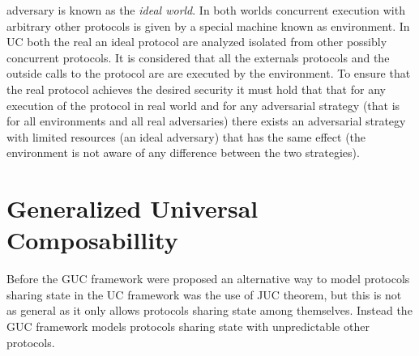 adversary is known as the \textit{ideal world}. In both worlds concurrent execution with arbitrary other protocols is
given by a special machine known as environment. In UC both the real an ideal protocol are analyzed isolated from other
possibly concurrent protocols. It is considered that all the externals protocols and the outside calls to the protocol
are are executed by the environment.
To ensure that the real protocol achieves
the desired security it must hold that that for any execution of the protocol in real world and for any adversarial
strategy (that is for all environments and all real adversaries) there exists an adversarial strategy with limited
resources (an ideal adversary) that has the same effect (the environment is not aware of any difference between the
two strategies).\\


\section{Generalized Universal Composabillity}

Before the GUC framework were proposed an alternative way
to model protocols sharing state in the UC framework was the use of JUC theorem, but this is not as general as
it only allows protocols sharing state among themselves. Instead the GUC framework models protocols sharing state with
unpredictable other protocols.\\

